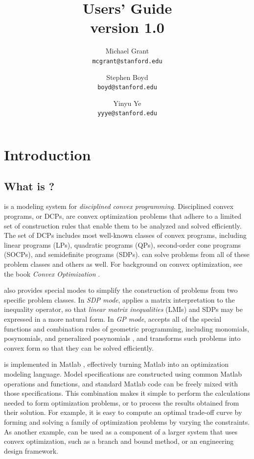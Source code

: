 \documentclass[12pt]{article}
\title{\cvx Users' Guide\\\large version 1.0}
\author{Michael Grant\\\texttt{mcgrant@stanford.edu} 
\and Stephen Boyd\\\texttt{boyd@stanford.edu}
\and Yinyu Ye\\\texttt{yyye@stanford.edu}}
\begin{document}
\maketitle
\clearpage
\tableofcontents
\clearpage

\section{Introduction}

\subsection{What is \cvx?}

\cvx is a modeling system for \emph{disciplined convex programming}. 
Disciplined convex programs, or DCPs, are convex optimization problems 
that adhere to a limited set of construction rules that 
enable them to be analyzed and solved efficiently. The set of 
DCPs includes most well-known classes of convex programs, including
linear programs (LPs), quadratic programs (QPs), second-order
cone programs (SOCPs), and semidefinite programs (SDPs). 
\cvx can solve problems from all of these problem classes and others as well.
For background on convex optimization,
see the book \emph{Convex Optimization} \cite{BV:04}.

\cvx also provides special modes to simplify the construction of problems
from two specific problem classes. In \emph{SDP mode}, \cvx applies
a matrix interpretation to the inequality operator, so that
\emph{linear matrix inequalities} (LMIs) and SDPs may be expressed
in a more natural form. In \emph{GP mode}, \cvx accepts all of the
special functions and combination rules of geometric programming,
including monomials, posynomials, and generalized posynomials \cite{BKVH:05},
and transforms such problems into convex form
so that they can be solved efficiently.

\cvx is implemented in Matlab \cite{MATLAB}, effectively
turning Matlab into an optimization modeling language.
Model specifications are constructed using common Matlab
operations and functions, and standard Matlab code can be
freely mixed with those specifications. This combination
makes it simple to perform the calculations
needed to form optimization problems, or to process the
results obtained from their solution. For example, it is easy
to compute an optimal trade-off curve
by forming and solving a family of optimization problems
by varying the constraints. As another example, \cvx can
be used as a component of a larger system that uses convex
optimization, such as a branch and bound method,
or an engineering design framework.
\end{document}
